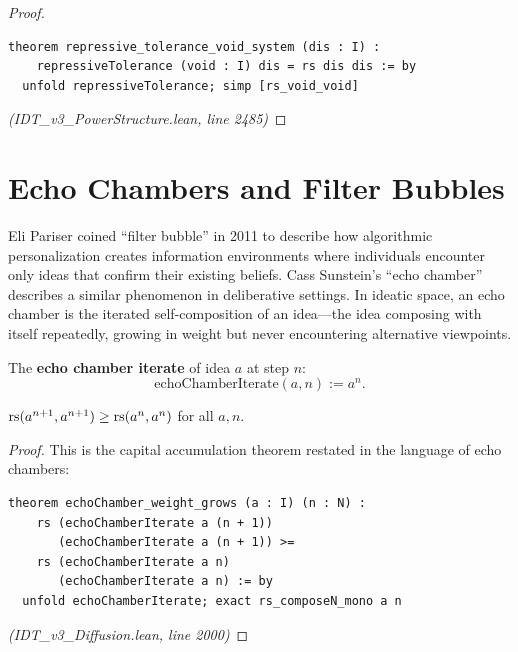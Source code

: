 \begin{proof}
\begin{lstlisting}
theorem repressive_tolerance_void_system (dis : I) :
    repressiveTolerance (void : I) dis = rs dis dis := by
  unfold repressiveTolerance; simp [rs_void_void]
\end{lstlisting}
\textit{(IDT\_v3\_PowerStructure.lean, line 2485)}
\end{proof}

\section{Echo Chambers and Filter Bubbles}

Eli Pariser coined ``filter bubble'' in 2011 to describe how algorithmic
personalization creates information environments where individuals encounter
only ideas that confirm their existing beliefs. Cass Sunstein's ``echo chamber''
describes a similar phenomenon in deliberative settings. In ideatic space, an
echo chamber is the iterated self-composition of an idea---the idea composing
with itself repeatedly, growing in weight but never encountering alternative
viewpoints.

\begin{definition}
\label{def:echo-chamber}
The \textbf{echo chamber iterate} of idea $a$ at step $n$:
\[
  \mathrm{echoChamberIterate}(a, n) := a^n.
\]
\end{definition}

\begin{theorem}
\label{thm:echo-chamber-grows}
$\mathrm{rs}(a^{n+1}, a^{n+1}) \geq \mathrm{rs}(a^n, a^n)$ for all $a, n$.
\end{theorem}

\begin{proof}
This is the capital accumulation theorem restated in the language of echo chambers:
\begin{lstlisting}
theorem echoChamber_weight_grows (a : I) (n : N) :
    rs (echoChamberIterate a (n + 1))
       (echoChamberIterate a (n + 1)) >=
    rs (echoChamberIterate a n)
       (echoChamberIterate a n) := by
  unfold echoChamberIterate; exact rs_composeN_mono a n
\end{lstlisting}
\textit{(IDT\_v3\_Diffusion.lean, line 2000)}
\end{proof}

